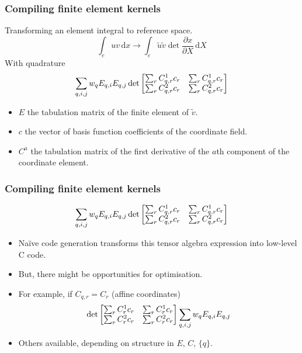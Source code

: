 \documentclass[presentation]{beamer}
\begin{document}
\begin{frame}[fragile]
  \frametitle{Compiling finite element kernels}
  Transforming an element integral to reference space.
  \begin{equation*}
    \int_e u v\, \text{d}x \rightarrow \int_e \tilde{u} \tilde{v} \det{\frac{\partial x}{\partial
        X}}\,\text{d} X
  \end{equation*}
  With quadrature
  \begin{equation*}
    \sum_{q,i,j} w_q E_{q,i} E_{q,j} \det{%
      \begin{bmatrix}
        \sum_r C_{q,r}^{1}c_r & \sum_r C_{q,r}^{1}c_r \\
        \sum_r C_{q,r}^{2}c_r & \sum_r C_{q,r}^{2}c_r
      \end{bmatrix}
    }
  \end{equation*}
  \begin{itemize}
  \item $E$ the tabulation matrix of the finite element of $\tilde{v}$.
  \item $c$ the vector of basis function coefficients of the
    coordinate field.
  \item $C^a$ the tabulation matrix of the first derivative of the
    $a$th component of the coordinate element.
  \end{itemize}
\end{frame}
\begin{frame}
  \frametitle{Compiling finite element kernels}
  \begin{equation*}
    \sum_{q, i, j} w_q E_{q,i} E_{q,j} \det{%
      \begin{bmatrix}
        \sum_r C_{q,r}^{1}c_r & \sum_r C_{q,r}^{1}c_r \\
        \sum_r C_{q,r}^{2}c_r & \sum_r C_{q,r}^{2}c_r
      \end{bmatrix}
    }
  \end{equation*}

  \begin{itemize}
  \item Na\"ive code generation transforms this tensor algebra
    expression into low-level C code.
  \item But, there might be opportunities for optimisation.
  \item For example, if $C_{q,r} = C_r$ (affine coordinates)
  \begin{equation*}
    \det{%
      \begin{bmatrix}
        \sum_r C_{r}^{1}c_r & \sum_r C_{r}^{1}c_r \\
        \sum_r C_{r}^{2}c_r & \sum_r C_{r}^{2}c_r
      \end{bmatrix}
    }\sum_{q, i, j} w_q E_{q,i} E_{q,j}
  \end{equation*}
\item Others available, depending on structure in $E$, $C$, $\{q\}$.
  \end{itemize}
\end{frame}
\end{document}
